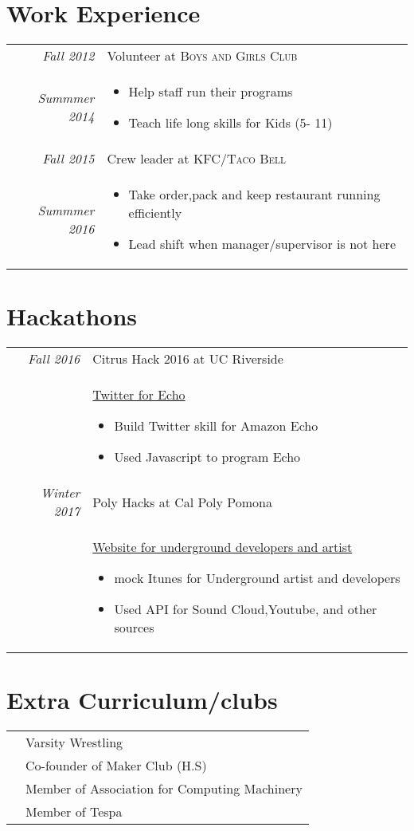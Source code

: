 \documentclass[a4paper,12pt]{article}
\begin{document}
\section{Work Experience}

\begin{tabular}{r|p{11cm}}
 \emph{Fall 2012} & Volunteer at \textsc{Boys and Girls Club} \\\emph{Summmer 2014}&\footnotesize\begin{itemize}
  \item Help staff run their programs
  \item Teach life long skills for Kids (5- 11)
\end{itemize}\\

\emph{Fall 2015} & Crew leader at \textsc{KFC/Taco Bell} \\\emph{Summmer 2016}&\footnotesize\begin{itemize}
  \item Take order,pack and keep restaurant running efficiently 
  \item Lead shift when manager/supervisor is not here
\end{itemize}\\
\end{tabular}


\section{Hackathons}
\begin{tabular}{r|p{11cm}}
 \emph{Fall 2016} & Citrus Hack 2016 at UC Riverside\\
    &\href{https://github.com/jluo117/echo_twitter_program}{Twitter for Echo}
 \footnotesize\begin{itemize}
  \item Build Twitter skill for Amazon Echo
  \item Used Javascript to program Echo
\end{itemize}\\
\emph{Winter 2017} & Poly Hacks at Cal Poly Pomona\\
    & \href{https://github.com/jluo117/PolyHacks}{Website for underground developers and artist}
 \footnotesize\begin{itemize}
  \item mock Itunes for Underground artist and developers
  \item Used API for Sound Cloud,Youtube, and other sources
\end{itemize}
\end{tabular}
\section{Extra Curriculum/clubs}
\begin{tabular}{rl}
&Varsity Wrestling \\
&Co-founder of Maker Club (H.S)\\
&Member of Association for Computing Machinery \\
&Member of Tespa\\


\end{tabular}
\end{document}
